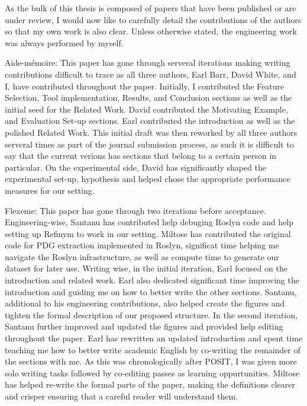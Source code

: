 \begin{acknowledgements}
As the bulk of this thesis is composed of papers that have been published or are
under review, I would now like to carefully detail the contributions of the
authors so that my own work is also clear. Unless otherwise stated, the
engineering work was always performed by myself.

Aide-m\'emoire: This paper has gone through serveral iterations making writing
contributions difficult to trace as all three authors, Earl Barr, David White,
and I, have contributed throughout the paper. Initially, I contributed the
Feature Selection, Tool implementation, Results, and Conclusion sections as well
as the initial seed for the Related Work. David contributed the Motivating
Example, and Evaluation Set-up sections. Earl contributed the introduction as
well as the polished Related Work. This initial draft was then reworked by all
three authors serveral times as part of the journal submission process, as such
it is difficult to say that the current verions has sections that belong to a
certain person in particular. On the experimental side, David has significantly
shaped the experimental set-up, hypothesis and helped chose the appropriate
performance measures for our setting.

Flexeme: This paper has gone through two iterations before acceptance.
Engineering-wise, Santanu has contributed help debuging Roslyn code and help
setting up Refinym to work in our setting. Miltose has contributed the original
code for PDG extraction implemented in Roslyn, significat time helping me
navigate the Roslyn infrastructure, as well as compute time to generate our
dataset for later use. Writing wise, in the initial iteration, Earl focused on
the introduction and related work. Earl also dedicated significant time
improving the introduction and guiding me on how to better write the other
sections. Santanu, additional to his engineering contributions, also helped
create the figures and tighten the formal description of our proposed structure.
In the second iteration, Santanu further improved and updated the figures and
provided help editing throughout the paper. Earl has rewritten an updated
introduction and spent time teaching me how to better write academic English by
co-writing the remainder of the sections with me. As this was chronologically
after POSIT, I was given more solo writing tasks followed by co-editing passes
as learning oppurtunities. Miltose has helped re-write the formal parts of the
paper, making the definitions clearer and crisper ensuring that a careful reader
will understand them.


\end{acknowledgements}
